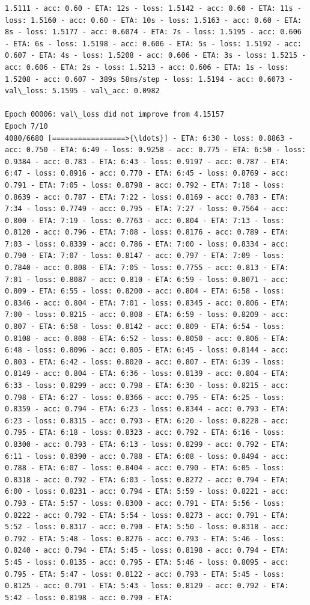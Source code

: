 \documentclass[11pt]{article}
\begin{document}
\begin{Verbatim}[commandchars=\\\{\}]
1.5111 - acc: 0.60 - ETA: 12s - loss: 1.5142 - acc: 0.60 - ETA: 11s - loss: 1.5160 - acc: 0.60 - ETA: 10s - loss: 1.5163 - acc: 0.60 - ETA: 8s - loss: 1.5177 - acc: 0.6074 - ETA: 7s - loss: 1.5195 - acc: 0.606 - ETA: 6s - loss: 1.5198 - acc: 0.606 - ETA: 5s - loss: 1.5192 - acc: 0.607 - ETA: 4s - loss: 1.5208 - acc: 0.606 - ETA: 3s - loss: 1.5215 - acc: 0.606 - ETA: 2s - loss: 1.5213 - acc: 0.606 - ETA: 1s - loss: 1.5208 - acc: 0.607 - 389s 58ms/step - loss: 1.5194 - acc: 0.6073 - val\_loss: 5.1595 - val\_acc: 0.0982

Epoch 00006: val\_loss did not improve from 4.15157
Epoch 7/10
4080/6680 [=================>{\ldots}] - ETA: 6:30 - loss: 0.8863 - acc: 0.750 - ETA: 6:49 - loss: 0.9258 - acc: 0.775 - ETA: 6:50 - loss: 0.9384 - acc: 0.783 - ETA: 6:43 - loss: 0.9197 - acc: 0.787 - ETA: 6:47 - loss: 0.8916 - acc: 0.770 - ETA: 6:45 - loss: 0.8769 - acc: 0.791 - ETA: 7:05 - loss: 0.8798 - acc: 0.792 - ETA: 7:18 - loss: 0.8639 - acc: 0.787 - ETA: 7:22 - loss: 0.8169 - acc: 0.783 - ETA: 7:34 - loss: 0.7749 - acc: 0.795 - ETA: 7:27 - loss: 0.7564 - acc: 0.800 - ETA: 7:19 - loss: 0.7763 - acc: 0.804 - ETA: 7:13 - loss: 0.8120 - acc: 0.796 - ETA: 7:08 - loss: 0.8176 - acc: 0.789 - ETA: 7:03 - loss: 0.8339 - acc: 0.786 - ETA: 7:00 - loss: 0.8334 - acc: 0.790 - ETA: 7:07 - loss: 0.8147 - acc: 0.797 - ETA: 7:09 - loss: 0.7840 - acc: 0.808 - ETA: 7:05 - loss: 0.7755 - acc: 0.813 - ETA: 7:01 - loss: 0.8087 - acc: 0.810 - ETA: 6:59 - loss: 0.8071 - acc: 0.809 - ETA: 6:55 - loss: 0.8200 - acc: 0.804 - ETA: 6:58 - loss: 0.8346 - acc: 0.804 - ETA: 7:01 - loss: 0.8345 - acc: 0.806 - ETA: 7:00 - loss: 0.8215 - acc: 0.808 - ETA: 6:59 - loss: 0.8209 - acc: 0.807 - ETA: 6:58 - loss: 0.8142 - acc: 0.809 - ETA: 6:54 - loss: 0.8108 - acc: 0.808 - ETA: 6:52 - loss: 0.8050 - acc: 0.806 - ETA: 6:48 - loss: 0.8096 - acc: 0.805 - ETA: 6:45 - loss: 0.8144 - acc: 0.803 - ETA: 6:42 - loss: 0.8020 - acc: 0.807 - ETA: 6:39 - loss: 0.8149 - acc: 0.804 - ETA: 6:36 - loss: 0.8139 - acc: 0.804 - ETA: 6:33 - loss: 0.8299 - acc: 0.798 - ETA: 6:30 - loss: 0.8215 - acc: 0.798 - ETA: 6:27 - loss: 0.8366 - acc: 0.795 - ETA: 6:25 - loss: 0.8359 - acc: 0.794 - ETA: 6:23 - loss: 0.8344 - acc: 0.793 - ETA: 6:23 - loss: 0.8315 - acc: 0.793 - ETA: 6:20 - loss: 0.8228 - acc: 0.795 - ETA: 6:18 - loss: 0.8323 - acc: 0.792 - ETA: 6:16 - loss: 0.8300 - acc: 0.793 - ETA: 6:13 - loss: 0.8299 - acc: 0.792 - ETA: 6:11 - loss: 0.8390 - acc: 0.788 - ETA: 6:08 - loss: 0.8494 - acc: 0.788 - ETA: 6:07 - loss: 0.8404 - acc: 0.790 - ETA: 6:05 - loss: 0.8318 - acc: 0.792 - ETA: 6:03 - loss: 0.8272 - acc: 0.794 - ETA: 6:00 - loss: 0.8231 - acc: 0.794 - ETA: 5:59 - loss: 0.8221 - acc: 0.793 - ETA: 5:57 - loss: 0.8300 - acc: 0.791 - ETA: 5:56 - loss: 0.8222 - acc: 0.792 - ETA: 5:54 - loss: 0.8273 - acc: 0.791 - ETA: 5:52 - loss: 0.8317 - acc: 0.790 - ETA: 5:50 - loss: 0.8318 - acc: 0.792 - ETA: 5:48 - loss: 0.8276 - acc: 0.793 - ETA: 5:46 - loss: 0.8240 - acc: 0.794 - ETA: 5:45 - loss: 0.8198 - acc: 0.794 - ETA: 5:45 - loss: 0.8135 - acc: 0.795 - ETA: 5:46 - loss: 0.8095 - acc: 0.795 - ETA: 5:47 - loss: 0.8122 - acc: 0.793 - ETA: 5:45 - loss: 0.8125 - acc: 0.791 - ETA: 5:43 - loss: 0.8129 - acc: 0.792 - ETA: 5:42 - loss: 0.8198 - acc: 0.790 - ETA: 
\end{Verbatim}
\end{document}

